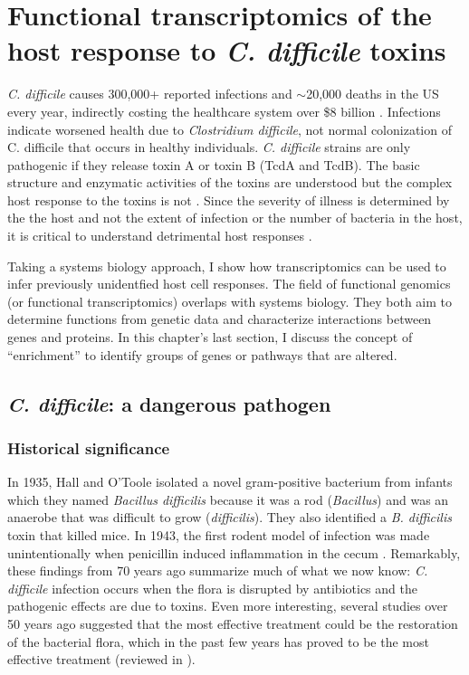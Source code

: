 \chapter[Functional transcriptomics of toxin response]{Functional transcriptomics of the host response to \textit{C. difficile} toxins}\label{chapter:introbmc}

\textit{C. difficile} causes 300,000+ reported infections and $\sim$20,000 deaths in the US every year,
indirectly costing the healthcare system over \${}8 billion \cite{Lucado:2012wl}.
Infections indicate worsened health due to \textit{Clostridium difficile},
not normal colonization of C. difficile that occurs in healthy individuals.
\textit{C. difficile} strains are only pathogenic if
they release toxin A or toxin B (TcdA and TcdB).
The basic structure and enzymatic activities of the toxins
are understood but the complex host response to the toxins
is not \cite{Pruitt:2010cy,Pruitt:2012kx,Genisyuerek:2011dr,
Just:1995kz,Just:1995ei,Sun:2010kt}. 
Since the severity of illness is determined
by the the host and not the extent of infection
or the number of bacteria in the host, it is critical
to understand detrimental host responses \cite{ElFeghaly:2013gq}.

Taking a systems biology approach, I show how transcriptomics
can be used to infer previously unidentfied host cell responses.
The field of functional genomics (or functional transcriptomics) overlaps
with systems biology. They both aim to determine functions from genetic data
and characterize interactions between genes and proteins. In this chapter's last section, I
discuss the concept of ``enrichment'' to identify
groups of genes or pathways that are altered.

\section{\textit{C. difficile}: a dangerous pathogen}

\subsection{Historical significance}

In 1935, Hall and O'Toole isolated a novel gram-positive bacterium from infants which
they named \textit{Bacillus difficilis} because it was a rod (\textit{Bacillus})
and was an anaerobe that was difficult to grow (\textit{difficilis}). 
They also identified a \textit{B. difficilis} toxin that killed mice.
In 1943, the first rodent model of infection was made unintentionally
when penicillin induced inflammation in the cecum \cite{Hamre:1943te}.
Remarkably, these findings from 70 years ago summarize
much of what we now know: \textit{C. difficile} infection occurs
when the flora is disrupted by antibiotics and the pathogenic
effects are due to toxins. Even more interesting, several
studies over 50 years ago suggested that the most effective treatment
could be the restoration of the bacterial flora, which
in the past few years has proved to be the most effective 
treatment (reviewed in \cite{Bartlett:2008jx}).

